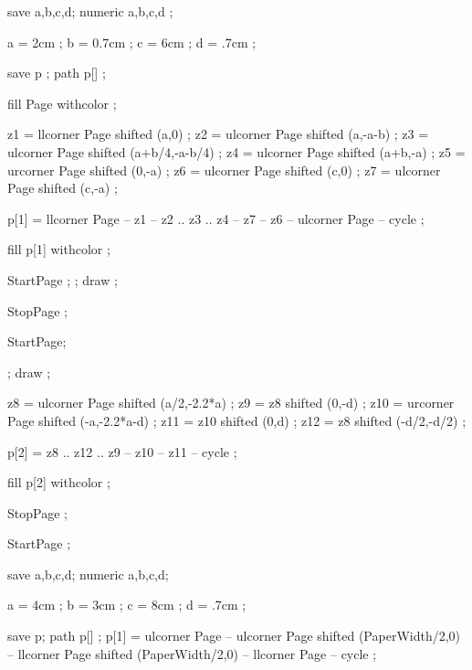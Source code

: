 
save a,b,c,d;
numeric a,b,c,d ;

a = 2cm ;   b = 0.7cm ;
c = 6cm ;   d = .7cm ;

save p ; path p[] ;

fill Page withcolor  ;

z1 = llcorner Page shifted (a,0) ;
z2 = ulcorner Page shifted (a,-a-b) ;
z3 = ulcorner Page shifted (a+b/4,-a-b/4) ;
z4 = ulcorner Page shifted (a+b,-a) ;
z5 = urcorner Page shifted (0,-a) ;
z6 = ulcorner Page shifted (c,0) ;
z7 = ulcorner Page shifted (c,-a) ;


p[1] = llcorner Page -- z1 -- z2 .. z3 .. z4 -- z7 -- z6 -- 
       ulcorner Page -- cycle ;

fill p[1] withcolor  ;

\stopuseMPgraphic

StartPage ;
 ;
draw  ;

StopPage ;
\stopuseMPgraphic

StartPage;

 ;
draw  ;


z8 = ulcorner Page shifted (a/2,-2.2*a) ;
z9 = z8 shifted (0,-d) ;
z10 = urcorner Page shifted (-a,-2.2*a-d) ;
z11 = z10 shifted (0,d) ;
z12 = z8 shifted (-d/2,-d/2) ;

p[2] = z8 .. z12 .. z9 -- z10 -- z11 -- cycle ;

fill p[2] withcolor  ;

StopPage ;
\stopuseMPgraphic

StartPage ;

save a,b,c,d;
numeric a,b,c,d;

a = 4cm ;   b = 3cm ;
c = 8cm ;   d = .7cm ;

save p; path p[] ;
p[1] = ulcorner Page -- ulcorner Page shifted (PaperWidth/2,0) -- 
       llcorner Page shifted (PaperWidth/2,0) -- llcorner Page -- cycle ;

